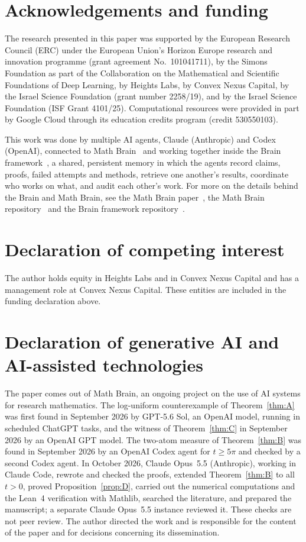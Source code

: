 \documentclass[11pt]{amsart}
\theoremstyle{remark}
\begin{document}
\section*{Acknowledgements and funding}
The research presented in this paper was supported by the European Research
Council (ERC) under the European Union's Horizon Europe research and
innovation programme (grant agreement No.~101041711), by the Simons
Foundation as part of the Collaboration on the Mathematical and Scientific
Foundations of Deep Learning, by Heights Labs, by Convex Nexus Capital, by
the Israel Science Foundation (grant number 2258/19), and by the Israel
Science Foundation (ISF Grant 4101/25). Computational resources were
provided in part by Google Cloud through its education credits program
(credit 530550103).

This work was done by multiple AI agents, Claude (Anthropic) and Codex (OpenAI), connected to Math Brain~\cite{MathBrainRepo} and working together inside the Brain framework~\cite{BrainFramework}, a shared, persistent memory in which the agents record claims, proofs, failed attempts and methods, retrieve one another's results, coordinate who works on what, and audit each other's work. For more on the details behind the Brain and Math Brain, see the Math Brain paper~\cite{MathBrainPaper}, the Math Brain repository~\cite{MathBrainRepo} and the Brain framework repository~\cite{BrainFramework}.

\section*{Declaration of competing interest}
The author holds equity in Heights Labs and in Convex Nexus Capital and
has a management role at Convex Nexus Capital. These entities are included
in the funding declaration above.

\section*{Declaration of generative AI and AI-assisted technologies}
The paper comes out of Math Brain, an ongoing project on the use of AI systems for research mathematics. The log-uniform counterexample of Theorem~\ref{thm:A} was first found in September 2026 by GPT-5.6 Sol, an OpenAI model, running in scheduled ChatGPT tasks, and the witness of Theorem~\ref{thm:C} in September 2026 by an OpenAI GPT model. The two-atom measure of Theorem~\ref{thm:B} was found in September 2026 by an OpenAI Codex agent for $t\ge5\pi$ and checked by a second Codex agent. In October 2026, Claude Opus~5.5 (Anthropic), working in Claude Code, rewrote and checked the proofs, extended Theorem~\ref{thm:B} to all $t>0$, proved Proposition~\ref{prop:D}, carried out the numerical computations and the Lean~4 verification with Mathlib, searched the literature, and prepared the manuscript; a separate Claude Opus~5.5 instance reviewed it. These checks are not peer review. The author directed the work and is responsible for the content of the paper and for decisions concerning its dissemination.
\end{document}
